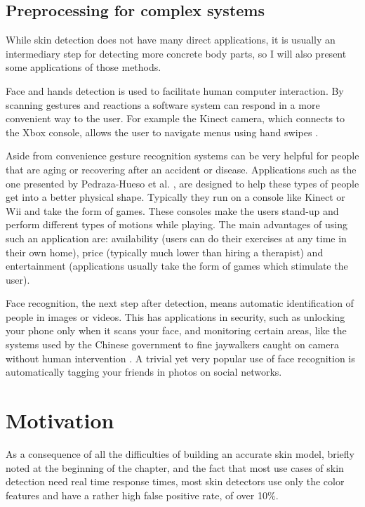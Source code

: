 \documentclass[12pt]{report}
\begin{document}
	\subsection{Preprocessing for complex systems}
	While skin detection does not have many direct applications, it is usually an intermediary step for detecting more concrete body parts, so I will also present some applications of those methods.
	
	Face and hands detection is used to facilitate human computer interaction. By scanning gestures and reactions a software system can respond in a more convenient way to the user. For example the Kinect camera, which connects to the Xbox console, allows the user to navigate menus using hand swipes \cite{kinect_control}. 
	
	Aside from convenience gesture recognition systems can be very helpful for people that are aging or recovering after an accident or disease. Applications such as the one presented by Pedraza-Hueso et al. \cite{rehabilitation_kinect}, are designed to help these types of people get into a better physical shape. Typically they run on a console like Kinect or Wii and take the form of games. These consoles make the users stand-up and perform different types of motions while playing. The main advantages of using such an application are: availability (users can do their exercises at any time in their own home), price (typically much lower than hiring a therapist) and entertainment (applications usually take the form of games which stimulate the user).
	
	Face recognition, the next step after detection, means automatic identification of people in images or videos\cite{detecting_faces_a_survey}. This has applications in security, such as unlocking your phone only when it scans your face, and monitoring certain areas, like the systems used by the Chinese government to fine jaywalkers caught on camera without human intervention \cite{jaywalkers_china}. A trivial yet very popular use of face recognition is automatically tagging your friends in photos on social networks.
	
	\section{Motivation}
	As a consequence of all the difficulties of building an accurate skin model, briefly noted at the beginning of the chapter, and the fact that most use cases of skin detection need real time response times, most skin detectors use only the color features and have a rather high false positive rate, of over 10\%\cite{survey_skin_color_modeling}. 
	
\end{document}
